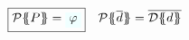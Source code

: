 \begin{figure}
\[\begin{array}{c}
\begin{array}{rcl}
{\begin{array}[t]{rl}
 \end{array}
}
\end{array}
\\ \\
\ruleform{\ptrans{\Sigma}{P} = \formula{\phi} } \quad
\ptrans{\Sigma}{\ol{d}} = \ol{\dtrans{\Sigma}{d}}
% 

\end{array}\]
\end{figure}
